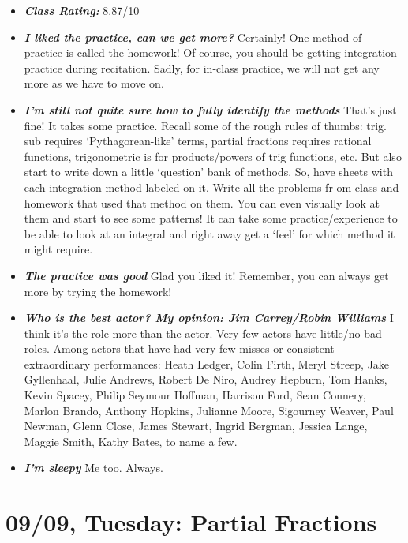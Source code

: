 \documentclass[11pt,letterpaper]{article}
\begin{document}
\begin{itemize}
\item {\bfseries\itshape Class Rating:} 8.87/10

\item {\bfseries\itshape I liked the practice, can we get more?} Certainly! One method of practice is called the homework! \Winkey Of course, you should be getting integration practice during recitation. Sadly, for in-class practice, we will not get any more as we have to move on. 

\item {\bfseries\itshape I'm still not quite sure how to fully identify the methods} That's just fine! It takes some practice. Recall some of the rough rules of thumbs: trig. sub requires `Pythagorean-like' terms, partial fractions requires rational functions, trigonometric is for products/powers of trig functions, etc. But also start to write down a little `question' bank of methods. So, have sheets with each integration method labeled on it. Write all the problems fr
om class and homework that used that method on them. You can even visually look at them and start to see some patterns! It can take some practice/experience to be able to look at an integral and right away get a `feel' for which method it might require. 

\item {\bfseries\itshape The practice was good} Glad you liked it! Remember, you can always get more by trying the homework! 

\item {\bfseries\itshape Who is the best actor? My opinion: Jim Carrey/Robin Williams} I think it's the role more than the actor. Very few actors have little/no bad roles. Among actors that have had very few misses or consistent extraordinary performances: Heath Ledger, Colin Firth, Meryl Streep, Jake Gyllenhaal, Julie Andrews, Robert De Niro, Audrey Hepburn, Tom Hanks, Kevin Spacey, Philip Seymour Hoffman, Harrison Ford, Sean Connery, Marlon Brando, Anthony Hopkins, Julianne Moore, Sigourney Weaver, Paul Newman, Glenn Close, James Stewart, Ingrid Bergman, Jessica Lange, Maggie Smith, Kathy Bates, to name a few.

\item {\bfseries\itshape I'm sleepy} Me too. Always. 
\end{itemize}

\newpage
\section*{09/09, Tuesday: Partial Fractions\label{09-09}}
\end{document}
